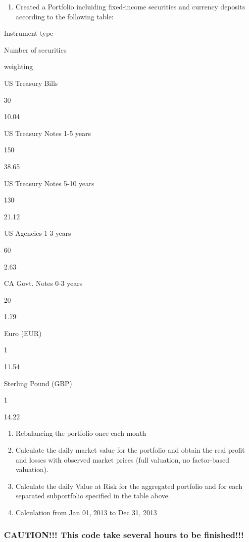 \documentclass[letterpaper,10pt,english]{/anaconda/lib/python2.7/site-packages/sphinx/texinputs/sphinxhowto}
\begin{document}
\begin{enumerate}
\def\labelenumi{\arabic{enumi}.}
\itemsep1pt\parskip0pt
\item
  Created a Portfolio incluiding fixed-income securities and currency
  deposits according to the following table:
\end{enumerate}

Instrument type

Number of securities

weighting

US Treasury Bills

30

10.04

US Treasury Notes 1-5 years

150

38.65

US Treasury Notes 5-10 years

130

21.12

US Agencies 1-3 years

60

2.63

CA Govt. Notes 0-3 years

20

1.79

Euro (EUR)

1

11.54

Sterling Pound (GBP)

1

14.22

\begin{enumerate}
\def\labelenumi{\arabic{enumi}.}
\setcounter{enumi}{1}
\item
  Rebalancing the portfolio once each month
\item
  Calculate the daily market value for the portfolio and obtain the real
  profit and losses with observed market prices (full valuation, no
  factor-based valuation).
\item
  Calculate the daily Value at Risk for the aggregated portfolio and for
  each separated subportfolio specified in the table above.
\item
  Calculation from Jan 01, 2013 to Dec 31, 2013
\end{enumerate}\subsubsection{CAUTION!!! This code take several hours to be finished!!!}
\end{document}
